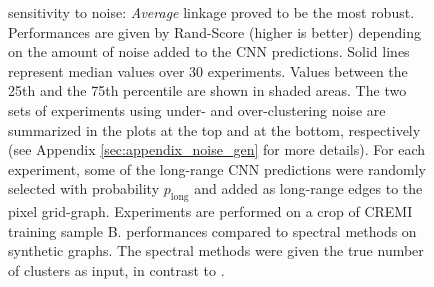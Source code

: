 \begin{figure}[t]
\caption{\algname{} sensitivity to noise: \emph{Average} linkage proved to be the most robust. Performances are given by Rand-Score (higher is better) depending on the amount of noise added to the CNN predictions. Solid lines represent median values over 30 experiments. Values between the 25th and the 75th percentile are shown in shaded areas. The two sets of experiments using under- and over-clustering noise are summarized in the plots at the top and at the bottom, respectively (see Appendix \ref{sec:appendix_noise_gen} for more details). For each experiment, some of the long-range CNN predictions were randomly selected with probability $p_{\mathrm{long}}$ and added as long-range edges to the pixel grid-graph. Experiments are performed on a crop of CREMI training sample B.
\algname{} performances compared to spectral methods on synthetic graphs. The spectral methods were given the true number of clusters as input, in contrast to \algname{}. 
}\label{fig:noise_plots}
\end{figure}


